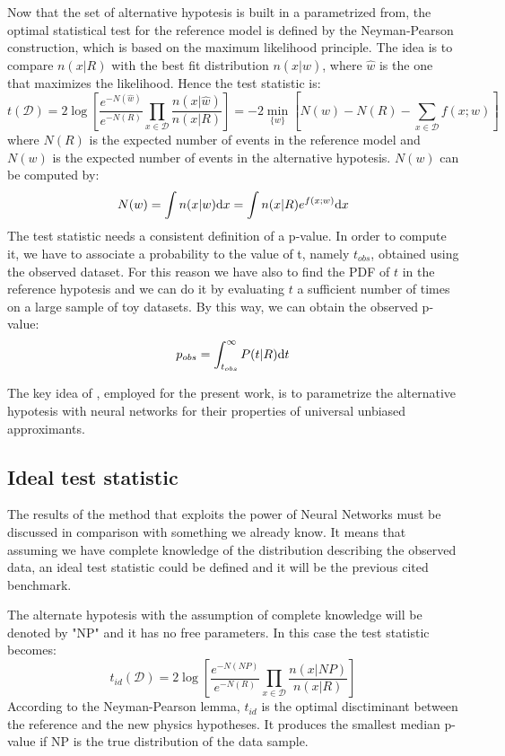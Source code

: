 Now that the set of alternative hypotesis is built in a parametrized from, the optimal statistical test for the reference model is defined by the Neyman-Pearson construction, which is based on the maximum likelihood principle. The idea is to compare $n(x|R)$ with the best fit distribution $n(x|\hat{w})$, where $\hat{w}$ is the one that maximizes the likelihood. Hence the test statistic is:
\begin{equation}
	\label{eqn:T}
	t(\mathcal{D}) = 2 \log{\left[
	\frac{e^{-N(\hat{w})}}{e^{-N(R)}} \prod_{x \in \mathcal{D}} \frac{n(x|\hat{w})}{n(x|R)}
	\right]}
	=
	-2 \min_{\{w\}}{\left[
	N(w) - N(R) - \sum_{x \in \mathcal{D}} f(x;w)
	\right]}
\end{equation}
where $N(R)$ is the expected number of events in the reference model  and $N(w)$ is the expected number of events in the alternative hypotesis. $N(w)$ can be computed by:
\begin{equation}
	N(w) = \int n(x|w) \mathrm{d} x = \int n(x|R) e^{f(x;w)} \mathrm{d} x
\end{equation}
The test statistic needs a consistent definition of a p-value. In order to compute it, we have to associate a probability to the value of t, namely $t_{obs}$, obtained using the observed dataset. For this reason we have also to find the PDF of $t$ in the reference hypotesis and we can do it by evaluating $t$ a sufficient number of times on a large sample of toy datasets. By this way, we can obtain the observed p-value:
\begin{equation}
	p_{obs} = \int_{t_{obs}}^{\infty} P(t|R) \mathrm{d} t
\end{equation}

The key idea of \cite{wulzer}, employed for the present work, is to parametrize the alternative hypotesis with neural networks for their properties of universal unbiased approximants.



\subsection{Ideal test statistic}
The results of the method that exploits the power of Neural Networks must be discussed in comparison with something we already know. It means that assuming we have complete knowledge of the distribution describing the observed data, an ideal test statistic could be defined and it will be the previous cited benchmark.

The alternate hypotesis with the assumption of complete knowledge will be denoted by "NP" and it has no free parameters. In this case the test statistic becomes:
\begin{equation}
	t_{id}(\mathcal{D}) = 2 \log{ 
	\left[
	\frac{e^{-N(NP)}}{e^{-N(R)}}
	\prod_{x \in \mathcal{D}} \frac{n(x|NP)}{n(x|R)}
	\right]
	}
\end{equation}
According to the Neyman-Pearson lemma, $t_{id}$ is the optimal disctiminant between the reference and the new physics hypotheses. It produces the smallest median p-value if NP is the true distribution of the data sample.

